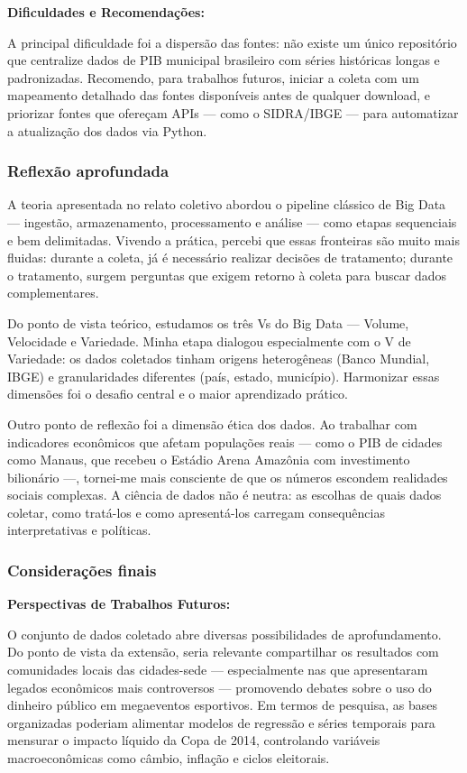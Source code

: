\documentclass[12pt, a4paper, brazil]{article}
\begin{document}
\vspace{0.4cm}
\textbf{Dificuldades e Recomendações:}

A principal dificuldade foi a dispersão das fontes: não existe um único repositório que centralize dados de PIB municipal brasileiro com séries históricas longas e padronizadas. Recomendo, para trabalhos futuros, iniciar a coleta com um mapeamento detalhado das fontes disponíveis antes de qualquer download, e priorizar fontes que ofereçam APIs — como o SIDRA/IBGE — para automatizar a atualização dos dados via Python.

\subsubsection{Reflexão aprofundada}
A teoria apresentada no relato coletivo abordou o pipeline clássico de Big Data — ingestão, armazenamento, processamento e análise — como etapas sequenciais e bem delimitadas. Vivendo a prática, percebi que essas fronteiras são muito mais fluidas: durante a coleta, já é necessário realizar decisões de tratamento; durante o tratamento, surgem perguntas que exigem retorno à coleta para buscar dados complementares.

Do ponto de vista teórico, estudamos os três Vs do Big Data — Volume, Velocidade e Variedade. Minha etapa dialogou especialmente com o V de Variedade: os dados coletados tinham origens heterogêneas (Banco Mundial, IBGE) e granularidades diferentes (país, estado, município). Harmonizar essas dimensões foi o desafio central e o maior aprendizado prático.

Outro ponto de reflexão foi a dimensão ética dos dados. Ao trabalhar com indicadores econômicos que afetam populações reais — como o PIB de cidades como Manaus, que recebeu o Estádio Arena Amazônia com investimento bilionário —, tornei-me mais consciente de que os números escondem realidades sociais complexas. A ciência de dados não é neutra: as escolhas de quais dados coletar, como tratá-los e como apresentá-los carregam consequências interpretativas e políticas.

\subsubsection{Considerações finais}
\textbf{Perspectivas de Trabalhos Futuros:}

O conjunto de dados coletado abre diversas possibilidades de aprofundamento. Do ponto de vista da extensão, seria relevante compartilhar os resultados com comunidades locais das cidades-sede — especialmente nas que apresentaram legados econômicos mais controversos — promovendo debates sobre o uso do dinheiro público em megaeventos esportivos. Em termos de pesquisa, as bases organizadas poderiam alimentar modelos de regressão e séries temporais para mensurar o impacto líquido da Copa de 2014, controlando variáveis macroeconômicas como câmbio, inflação e ciclos eleitorais.
\end{document}
